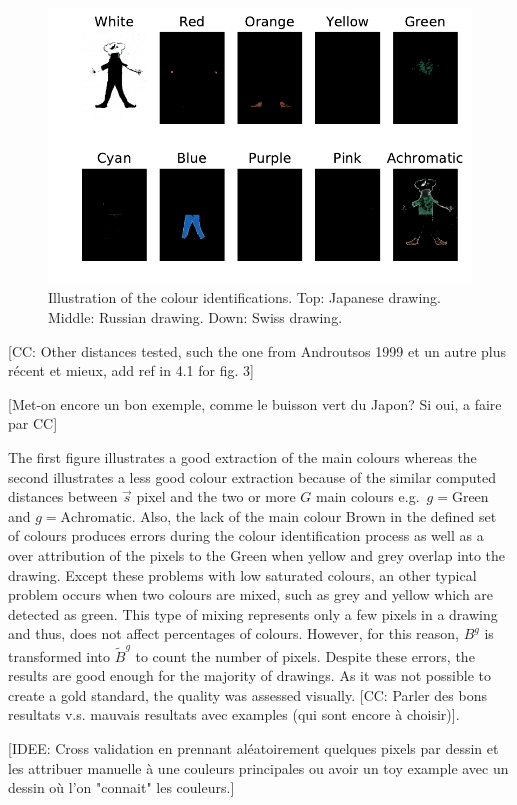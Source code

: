 \documentclass[11pt,a4paper]{article}
\begin{document}
\begin{figure}
	\includegraphics[width=0.62\linewidth]{figures/ch16_fr_m_rec_13_07_rap-rno_filter_mask.pdf}
	\caption{Illustration of the colour identifications. Top: Japanese drawing. Middle: Russian drawing. Down: Swiss drawing.}
	\label{fig:example}
\end{figure}



{\color{red}[CC: Other distances tested, such the one from Androutsos 1999 et un autre plus récent et mieux, add ref in 4.1 for fig. 3]}

{\color{red}[Met-on encore un bon exemple, comme le buisson vert du Japon? Si oui, a faire par CC]}

The first figure illustrates a good extraction of the main colours whereas the second illustrates a less good colour extraction because of the similar computed distances between $\vec{s}$  pixel and the two or more $G$ main colours e.g.~$g = \mbox{Green}$ and $g = \mbox{Achromatic}$. 
Also, the lack of the main colour Brown in the defined set of colours produces errors during the colour identification process as well as a over attribution of the pixels to the Green when yellow and grey overlap into the drawing. Except these problems with low saturated colours, an other typical problem occurs when two colours are mixed, such as grey and yellow which are detected as green. This type of mixing represents only a few pixels in a drawing and thus, does not affect percentages of colours. However, for this reason, $B^g$ is transformed into $\tilde{B}^g$ to count the number of pixels. Despite these errors, the results are good enough for the majority of drawings. As it was not possible to create a gold standard, the quality was assessed visually.
{\color{red}[CC:  Parler des bons resultats v.s. mauvais resultats avec examples (qui sont encore \`a choisir)]}.

{\small \color{teal}[IDEE: Cross validation en prennant al\' eatoirement quelques pixels par dessin et les attribuer manuelle \`a une couleurs principales ou avoir un toy example avec un dessin o\`u l'on "connait" les couleurs.]}
\end{document}
